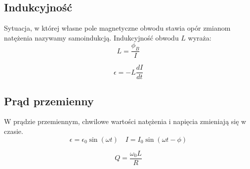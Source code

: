\documentclass{../notatki}
\begin{document}
\subsection{Indukcyjność}

Sytuacja, w której własne pole magnetyczne obwodu stawia opór zmianom
natężenia nazywamy samoindukcją. Indukcyjność obwodu $L$ wyraża:
$$
L = \frac{\phi_B}{I}
$$

$$
\epsilon = - L \frac{dI}{dt}
$$

\subsection{Prąd przemienny}

W prądzie przemiennym, chwilowe wartości natężenia i napięcia
zmieniają się w czasie.
$$
\epsilon = \epsilon_0 \sin(\omega t) \quad I = I_0 \sin(\omega t - \phi)
$$

$$
Q = \frac{\omega_0 L}{R}
$$
\end{document}
